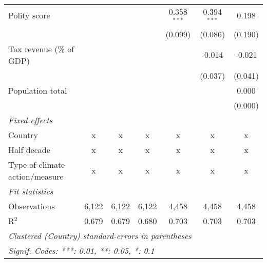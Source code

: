 \begin{tabular}{lcccccc}
   Polity score                                                &         &              &                & 0.358$^{***}$  & 0.394$^{***}$  & 0.198\\   
                                                               &         &              &                & (0.099)        & (0.086)        & (0.190)\\   
   Tax revenue (\% of GDP)                                     &         &              &                &                & -0.014         & -0.021\\   
                                                               &         &              &                &                & (0.037)        & (0.041)\\   
   Population total                                            &         &              &                &                &                & 0.000\\   
                                                               &         &              &                &                &                & (0.000)\\   
   \emph{Fixed effects}\\
   Country                                                     & x       & x            & x              & x              & x              & x\\  
   Half decade                                                 & x       & x            & x              & x              & x              & x\\  
   Type of climate action/measure                              & x       & x            & x              & x              & x              & x\\  
   \midrule \emph{Fit statistics}\\
   Observations                                                & 6,122   & 6,122        & 6,122          & 4,458          & 4,458          & 4,458\\  
   R$^2$                                                       & 0.679   & 0.679        & 0.680          & 0.703          & 0.703          & 0.703\\  
   \midrule
   \multicolumn{7}{l}{\emph{Clustered (Country) standard-errors in parentheses}}\\
   \multicolumn{7}{l}{\emph{Signif. Codes: ***: 0.01, **: 0.05, *: 0.1}}\\
\end{tabular}
\par\endgroup


